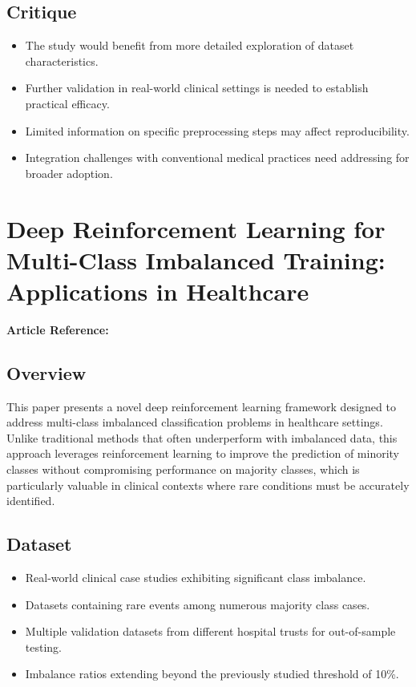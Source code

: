 \subsection*{Critique}
\begin{itemize}
    \item The study would benefit from more detailed exploration of dataset characteristics.
    \item Further validation in real-world clinical settings is needed to establish practical efficacy.
    \item Limited information on specific preprocessing steps may affect reproducibility.
    \item Integration challenges with conventional medical practices need addressing for broader adoption.
\end{itemize}

\section{Deep Reinforcement Learning for Multi-Class Imbalanced Training: Applications in Healthcare}
\textbf{Article Reference:} \cite{yangDeepReinforcementLearning2024}

\subsection*{Overview}
This paper presents a novel deep reinforcement learning framework designed to address multi-class imbalanced classification problems in healthcare settings. Unlike traditional methods that often underperform with imbalanced data, this approach leverages reinforcement learning to improve the prediction of minority classes without compromising performance on majority classes, which is particularly valuable in clinical contexts where rare conditions must be accurately identified.

\subsection*{Dataset}
\begin{itemize}
    \item Real-world clinical case studies exhibiting significant class imbalance.
    \item Datasets containing rare events among numerous majority class cases.
    \item Multiple validation datasets from different hospital trusts for out-of-sample testing.
    \item Imbalance ratios extending beyond the previously studied threshold of 10\%.
\end{itemize}

